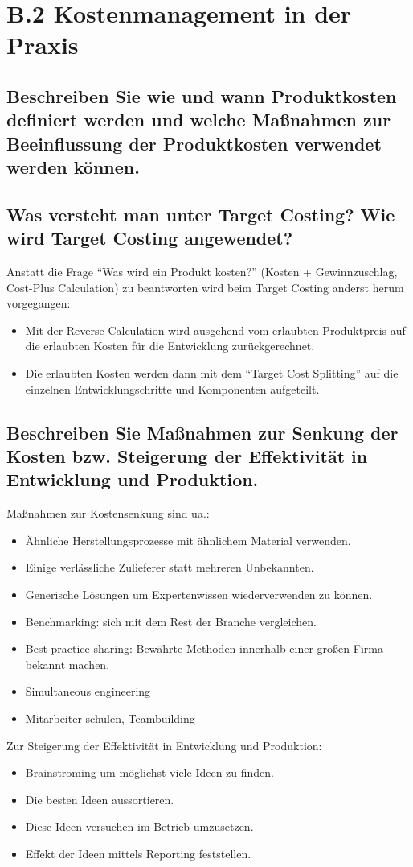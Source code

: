 \section*{B.2 Kostenmanagement in der Praxis}

\subsection{Beschreiben Sie wie und wann Produktkosten definiert werden und welche Ma\ss nahmen zur Beeinflussung der Produktkosten verwendet werden k\"onnen.}

\subsection{Was versteht man unter Target Costing? Wie wird Target Costing angewendet?}
Anstatt die Frage ``Was wird ein Produkt kosten?'' (Kosten + Gewinnzuschlag, Cost-Plus Calculation) zu beantworten wird beim
Target Costing anderst herum vorgegangen:
\begin{itemize}
	\item Mit der Reverse Calculation wird ausgehend vom erlaubten Produktpreis auf die erlaubten Kosten f\"ur die Entwicklung zur\"uckgerechnet.
	\item Die erlaubten Kosten werden dann mit dem ``Target Cost Splitting'' auf die einzelnen Entwicklungschritte und Komponenten aufgeteilt.
\end{itemize}

\subsection{Beschreiben Sie Ma\ss nahmen zur Senkung der Kosten bzw. Steigerung der Effektivit\"at in Entwicklung und Produktion.}
Ma\ss nahmen zur Kostensenkung sind ua.:
\begin{itemize}
	\item \"Ahnliche Herstellungsprozesse mit \"ahnlichem Material verwenden.
	\item Einige verl\"assliche Zulieferer statt mehreren Unbekannten.
	\item Generische L\"osungen um Expertenwissen wiederverwenden zu k\"onnen.

	\item Benchmarking:
		sich mit dem Rest der Branche vergleichen.
	\item Best practice sharing:
		Bew\"ahrte Methoden innerhalb einer gro\ss en Firma bekannt machen.
	\item Simultaneous engineering

	\item Mitarbeiter schulen, Teambuilding
\end{itemize}

Zur Steigerung der Effektivit\"at in Entwicklung und Produktion:
\begin{itemize}
	\item Brainstroming um m\"oglichst viele Ideen zu finden.
	\item Die besten Ideen aussortieren.
	\item Diese Ideen versuchen im Betrieb umzusetzen.
	\item Effekt der Ideen mittels Reporting feststellen.
\end{itemize}

